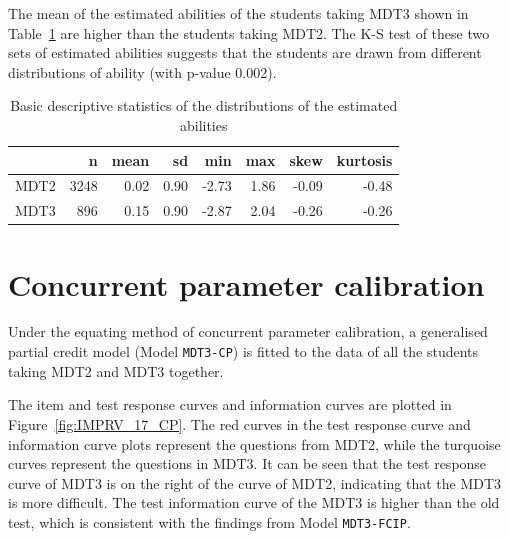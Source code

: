 \documentclass[a4paper]{report}
\begin{document}
The mean of the estimated abilities of the students taking MDT3 shown in Table~\ref{tab:IMPRV_FCIP_eap_dsc} are higher than the students taking MDT2. The K-S test of these two sets of estimated abilities suggests that the students are drawn from different distributions of ability (with p-value 0.002). 

\begin{table}[ht]
  \centering
  \begin{tabular}{rrrrrrrr}
    \hline
   & n & mean & sd & min & max & skew & kurtosis \\ 
    \hline
  MDT2 & 3248 & 0.02 & 0.90 & -2.73 & 1.86 & -0.09 & -0.48 \\ 
    MDT3 & 896 & 0.15 & 0.90 & -2.87 & 2.04 & -0.26 & -0.26 \\ 
     \hline
  \end{tabular}
  \caption{\label{tab:IMPRV_FCIP_eap_dsc}Basic descriptive statistics of the distributions of the estimated abilities}
\end{table}

\section{Concurrent parameter calibration}

Under the equating method of concurrent parameter calibration, a generalised partial credit model (Model \texttt{MDT3-CP}) is fitted to the data of all the students taking MDT2 and MDT3 together. 

The item and test response curves and information curves are plotted in Figure~\ref{fig:IMPRV_17_CP}. The red curves in the test response curve and information curve plots represent the questions from MDT2, while the turquoise curves represent the questions in MDT3. It can be seen that the test response curve of MDT3 is on the right of the curve of MDT2, indicating that the MDT3 is more difficult. The test information curve of the MDT3 is higher than the old test, which is consistent with the findings from Model \texttt{MDT3-FCIP}. 
\end{document}
